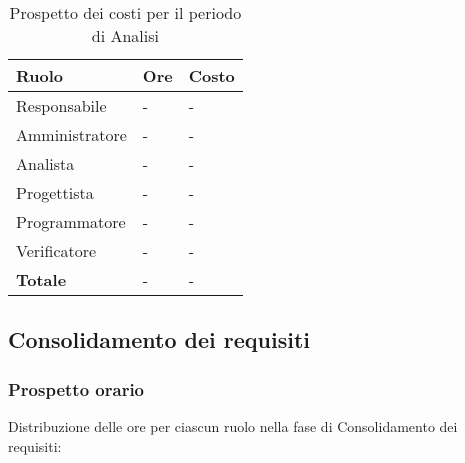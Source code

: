 		\begin{longtable}{ 
			>{\centering}p{} 
			>{\centering}p{}
			>{\centering\arraybackslash}p{} }
	
			\caption {Prospetto dei costi per il periodo di Analisi}		\\
			
			\textbf{\color{white}Ruolo} & 
			\textbf{\color{white}Ore} & 
			\textbf{\color{white}Costo}
			\tabularnewline  
			\endhead
			
			Responsabile & - & - \\
			Amministratore & - & - \\
			Analista & - & - \\
			Progettista & - & - \\
			Programmatore & - & - \\
			Verificatore & - & - \\
			\textbf{Totale} & - & - \\
		\end{longtable}
		
	
\subsection{Consolidamento dei requisiti}
	\subsubsection{Prospetto orario}
		Distribuzione delle ore per ciascun ruolo nella fase di Consolidamento dei requisiti:
		
